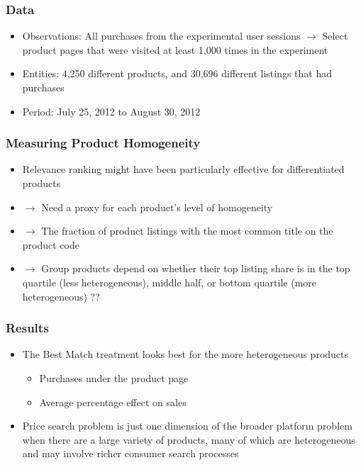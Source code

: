 \documentclass{beamer}
\begin{document}
\begin{frame}
\frametitle{Data}
\begin{itemize}
\item Observations: All purchases from the experimental user sessions $\to$ Select product pages that were visited at least 1,000 times in the experiment
\item Entities: 4,250 different products, and 30,696 different listings that had purchases
\item Period: July 25, 2012 to August 30, 2012
\end{itemize}
\end{frame}

\begin{frame}
\frametitle{Measuring Product Homogeneity}
\begin{itemize}
\item Relevance ranking might have been particularly effective for differentiated products
\item $\to$ Need a proxy for each product's level of homogeneity
\item $\to$ The fraction of product listings with the most common title on the product code
\item $\to$ Group products depend on whether their top listing share is in the top quartile (less heterogeneous), middle half, or bottom quartile (more heterogeneous) ??
\end{itemize}
\end{frame}

\begin{frame}
\frametitle{Results}
\begin{itemize}
\item The Best Match treatment looks best for the more heterogeneous products
  \begin{itemize}
  \item Purchases under the product page
  \item Average percentage effect on sales
  \end{itemize}
\item  Price search problem is just one dimension of the broader platform problem when there are a large variety of products, many of which are heterogeneous and may involve richer consumer search processes
\end{itemize}
\end{frame}
\end{document}
